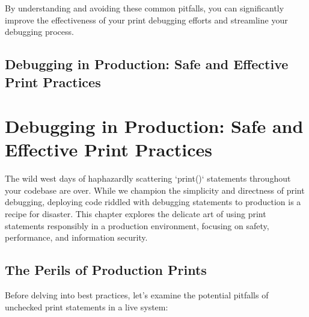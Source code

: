 \documentclass{article}
\begin{document}
By understanding and avoiding these common pitfalls, you can significantly improve the effectiveness of your print debugging efforts and streamline your debugging process.

\newpage

\section*{Debugging in Production: Safe and Effective Print Practices} %
\label{chapter-1-9-Debugging_in_Production__Safe_and_Effect}

\chapter{Debugging in Production: Safe and Effective Print Practices}

The wild west days of haphazardly scattering `print()` statements throughout your codebase are over. While we champion the simplicity and directness of print debugging, deploying code riddled with debugging statements to production is a recipe for disaster. This chapter explores the delicate art of using print statements responsibly in a production environment, focusing on safety, performance, and information security.

\section*{The Perils of Production Prints}

Before delving into best practices, let's examine the potential pitfalls of unchecked print statements in a live system:
\end{document}
